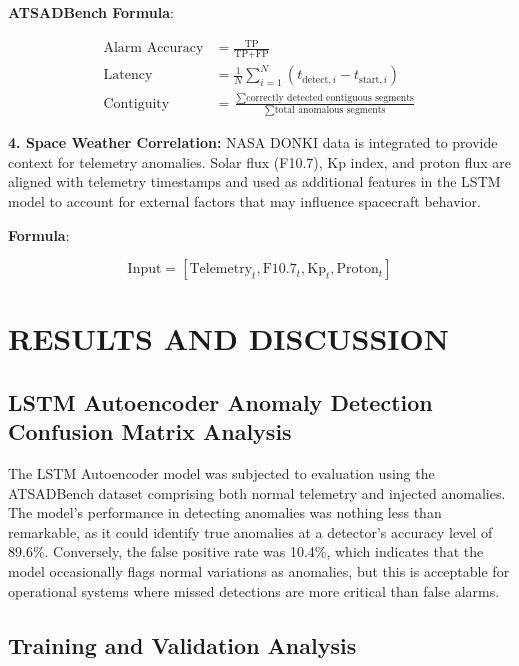 \documentclass[conference]{IEEEtran}
\begin{document}
\textbf{ATSADBench Formula}:

\begin{align}
\text{Alarm Accuracy} &= \frac{\text{TP}}{\text{TP} + \text{FP}}\\
\text{Latency} &= \frac{1}{N}\sum_{i=1}^{N} (t_{\text{detect},i} - t_{\text{start},i})\\
\text{Contiguity} &= \frac{\sum \text{correctly detected contiguous segments}}{\sum \text{total anomalous segments}}
\end{align}

\textbf{4. Space Weather Correlation:} NASA DONKI data is integrated to provide context for telemetry anomalies. Solar flux (F10.7), Kp index, and proton flux are aligned with telemetry timestamps and used as additional features in the LSTM model to account for external factors that may influence spacecraft behavior.

\textbf{Formula}:

$$\text{Input} = [\text{Telemetry}_t, \text{F10.7}_t, \text{Kp}_t, \text{Proton}_t]$$

\section{RESULTS AND DISCUSSION}

\subsection{LSTM Autoencoder Anomaly Detection Confusion Matrix Analysis}



The LSTM Autoencoder model was subjected to evaluation using the ATSADBench dataset comprising both normal telemetry and injected anomalies. The model's performance in detecting anomalies was nothing less than remarkable, as it could identify true anomalies at a detector's accuracy level of 89.6\%. Conversely, the false positive rate was 10.4\%, which indicates that the model occasionally flags normal variations as anomalies, but this is acceptable for operational systems where missed detections are more critical than false alarms.

\subsection{Training and Validation Analysis}
\end{document}
